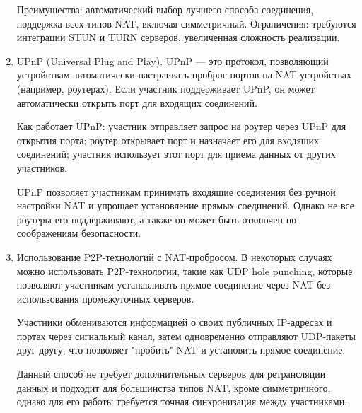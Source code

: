 \begin{enumerate}
  Преимущества: автоматический выбор лучшего способа соединения, поддержка всех типов NAT, включая симметричный.
  Ограничения: требуются интеграции STUN и TURN серверов, увеличенная сложность реализации.

  \item UPnP (Universal Plug and Play).
  UPnP --- это протокол, позволяющий устройствам автоматически настраивать проброс портов на NAT-устройствах (например, роутерах).
  Если участник поддерживает UPnP, он может автоматически открыть порт для входящих соединений.

  Как работает UPnP: участник отправляет запрос на роутер через UPnP для открытия порта; роутер открывает порт и назначает его для входящих соединений; участник использует этот порт для приема данных от других участников.

  UPnP позволяет участникам принимать входящие соединения без ручной настройки NAT и  упрощает установление прямых соединений.
  Однако не все роутеры его поддерживают, а также он может быть отключен по соображениям безопасности.

  \item Использование P2P-технологий с NAT-пробросом.
  В некоторых случаях можно использовать P2P-технологии, такие как UDP hole punching, которые позволяют участникам устанавливать прямое соединение через NAT без использования промежуточных серверов.

  Участники обмениваются информацией о своих публичных IP-адресах и портах через сигнальный канал, затем одновременно отправляют UDP-пакеты друг другу, что позволяет "пробить" NAT и установить прямое соединение.

  Данный способ не требует дополнительных серверов для ретрансляции данных и подходит для большинства типов NAT, кроме симметричного, однако для его работы требуется точная синхронизация между участниками.
\end{enumerate}
